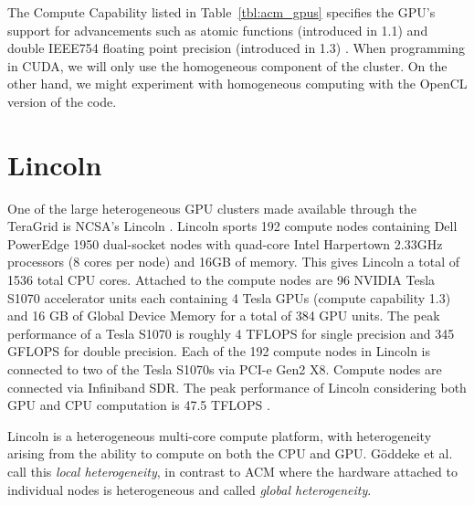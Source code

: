 The Compute Capability listed in Table~\ref{tbl:acm_gpus} specifies the GPU's support for advancements such as atomic functions (introduced in 1.1) and double IEEE754 floating point precision (introduced in 1.3) \cite{CudaGuide:2008}. When programming in CUDA, we will only use the homogeneous component of the cluster. On the other hand, we might experiment with homogeneous computing with the OpenCL version of the code. 


\section{Lincoln}

One of the large heterogeneous GPU clusters made available through the TeraGrid is NCSA's Lincoln \cite{Lincoln:2009}. Lincoln sports 192 compute nodes containing Dell PowerEdge 1950 dual-socket nodes with quad-core Intel Harpertown 2.33GHz processors (8 cores per node) and 16GB of memory. This gives Lincoln a total of 1536 total CPU cores. Attached to the compute nodes are 96 NVIDIA Tesla S1070 accelerator units each containing 4 Tesla GPUs (compute capability 1.3) and 16 GB of Global Device Memory for a total of 384 GPU units. The peak performance of a Tesla S1070 is roughly 4 TFLOPS for single precision and 345 GFLOPS for double precision. Each of the 192 compute nodes in Lincoln is connected to two of the Tesla S1070s via PCI-e Gen2 X8. Compute nodes are connected via Infiniband SDR. The peak performance of Lincoln considering both GPU and CPU computation is 47.5 TFLOPS \cite{Lincoln:2009}. 

Lincoln is a heterogeneous multi-core compute platform, with heterogeneity arising from the ability to compute on both the CPU and GPU. G\"{o}ddeke et al. \cite{Goeddeke:2007} call this \emph{local heterogeneity}, in contrast to ACM where the hardware attached to individual nodes is heterogeneous and called \emph{global heterogeneity}. 
%





